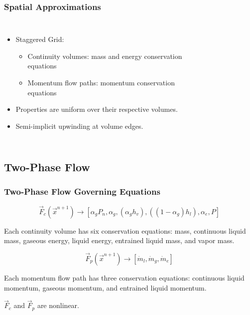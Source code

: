 \documentclass[compress,xcolor=table]{beamer}
\newlength{\hpw}
\begin{document}
\begin{frame}
\frametitle{Spatial Approximations}

\begin{columns}
\column{\hpw}

\begin{itemize}
\item{Staggered Grid:
\begin{itemize}
\item{Continuity volumes: mass and energy conservation equations}
\item{Momentum flow paths: momentum conservation equations}
\end{itemize}
}
\item{Properties are uniform over their respective volumes.}
\item{Semi-implicit upwinding at volume edges.}
\end{itemize}


\column{\hpw}
\begin{figure}
\centering
\resizebox{\textwidth}{!}{

}
\end{figure}
\end{columns}

\end{frame}
\subsection[Two-Phase Flow]{Two-Phase Flow}
\begin{frame}
\frametitle{Two-Phase Flow Governing Equations}

\begin{equation*}
\vec{F}_{c}(\vec{x}^{n+1}) \rightarrow \left[\alpha_{g} P_{n},\alpha_{g}, (\alpha_{g} h_{v}), ((1-\alpha_{g})h_{l}), \alpha_{e}, P\right]
\end{equation*}

Each continuity volume has six conservation equations: \ncg{} mass, continuous liquid mass, gaseous energy, liquid energy, entrained liquid mass, and vapor mass.

\begin{equation*}
\vec{F}_{p}(\vec{x}^{n+1}) \rightarrow \left[\dot{m}_{l}, \dot{m}_{g}, \dot{m}_{e} \right]
\end{equation*}

Each momentum flow path has three conservation equations:
continuous liquid momentum, gaseous momentum, and entrained liquid momentum.

\begin{center}
$\vec{F}_{c}$ and $\vec{F}_{p}$ are nonlinear.
\end{center} 

\end{frame}
\end{document}
